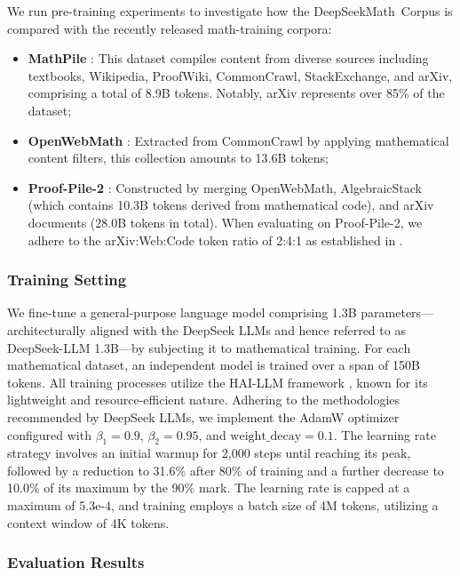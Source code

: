 \begin{itemize}[topsep=0pt]
We run pre-training experiments to investigate how the DeepSeekMath~Corpus is compared with the recently released math-training corpora:

\begin{itemize}[topsep=0pt]
    \item \textbf{MathPile} \citep{mathpile}: This dataset compiles content from diverse sources including textbooks, Wikipedia, ProofWiki, CommonCrawl, StackExchange, and arXiv, comprising a total of 8.9B tokens. Notably, arXiv represents over 85\% of the dataset;
    \item \textbf{OpenWebMath} \citep{openwebmath}: Extracted from CommonCrawl by applying mathematical content filters, this collection amounts to 13.6B tokens;
    \item \textbf{Proof-Pile-2} \citep{llemma}: Constructed by merging OpenWebMath, AlgebraicStack (which contains 10.3B tokens derived from mathematical code), and arXiv documents (28.0B tokens in total). When evaluating on Proof-Pile-2, we adhere to the arXiv:Web:Code token ratio of 2:4:1 as established in \cite{llemma}.
\end{itemize}

\subsubsection{Training Setting}
\label{sec:quality-policy}
We fine-tune a general-purpose language model comprising 1.3B parameters—architecturally aligned with the DeepSeek LLMs \citep{deepseek-llm} and hence referred to as DeepSeek-LLM 1.3B—by subjecting it to mathematical training. For each mathematical dataset, an independent model is trained over a span of 150B tokens. All training processes utilize the HAI-LLM framework \citep{haillm}, known for its lightweight and resource-efficient nature. Adhering to the methodologies recommended by DeepSeek LLMs, we implement the AdamW optimizer \citep{adamW} configured with $\beta_1=0.9$, $\beta_2=0.95$, and $\mathrm{weight\_decay}=0.1$. The learning rate strategy involves an initial warmup for 2,000 steps until reaching its peak, followed by a reduction to 31.6\% after 80\% of training and a further decrease to 10.0\% of its maximum by the 90\% mark. The learning rate is capped at a maximum of 5.3e-4, and training employs a batch size of 4M tokens, utilizing a context window of 4K tokens.

\subsubsection{Evaluation Results}


\end{itemize}

